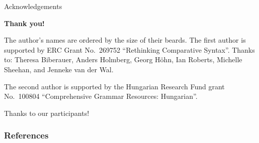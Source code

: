 \documentclass[12pt]{beamer}
\begin{document}
\begin{frame}{Acknowledgements}

\begin{center}
    \Large \textbf{Thank you!}
\end{center}

The author's names are ordered by the size of their beards.  The first author
is supported by ERC Grant No.\ 269752 \enquote{Rethinking Comparative Syntax}.
Thanks to: Theresa Biberauer, Anders Holmberg, Georg Höhn, Ian Roberts,
Michelle Sheehan, and Jenneke van der Wal.

The second author is supported by the Hungarian Research Fund grant No.\ 100804
\enquote{Comprehensive Grammar Resources: Hungarian}.

Thanks to our participants!

\end{frame}

\begin{frame}[t, allowframebreaks]

    \frametitle{References}
    \newrefcontext[sorting=nyt]
    \renewcommand*{\bibfont}{\footnotesize}
    \printbibliography[heading=none]

\end{frame}
\end{document}

